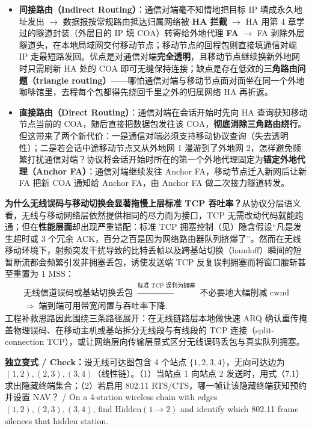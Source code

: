\begin{itemize}
\item \textbf{间接路由（Indirect Routing）}：通信对端毫不知情地把目标 IP 填成永久地址发出 $\to$ 数据报按常规路由抵达归属网络被 \textbf{HA 拦截} $\to$ HA 用第 4 章学过的隧道封装（外层目的 IP 填 COA）转寄给外地代理 \textbf{FA} $\to$ FA 剥除外层隧道头，在本地局域网交付移动节点；移动节点的回程包则直接填通信对端 IP 走最短路发回。优点是对通信对端\textbf{完全透明}，且移动节点继续换新外地网时只需刷新 HA 处的 COA 即可无缝保持连接；缺点是存在低效的\textbf{三角路由问题（triangle routing）}——哪怕通信对端与移动节点面对面坐在同一个外地咖啡馆里，去程每个包都得先绕回千里之外的归属网络 HA 再折返。
\item \textbf{直接路由（Direct Routing）}：通信对端在会话开始时先向 HA 查询获知移动节点当前的 COA，随后直接把数据包发往该 COA，\textbf{彻底消除三角路由绕行}。但这带来了两个新代价：一是通信对端必须支持移动协议查询（失去透明性）；二是若会话中途移动节点又从外地网 1 漫游到了外地网 2，怎样避免频繁打扰通信对端？协议将会话开始时所在的第一个外地代理固定为\textbf{锚定外地代理（Anchor FA）}：通信对端继续发往 Anchor FA，移动节点迁入新网后让新 FA 把新 COA 通知给 Anchor FA，由 Anchor FA 做二次接力隧道转发。
\end{itemize}

\textbf{为什么无线误码与移动切换会显著拖慢上层标准 TCP 吞吐率？}从协议分层语义看，无线与移动网络层依然提供相同的尽力而为接口，TCP 无需改动代码就能跑通；但在\textbf{性能层面}却出现严重错配：标准 TCP 拥塞控制（见）隐含假设“凡是发生超时或 3 个冗余 ACK，百分之百是因为网络路由器队列挤爆了”。然而在无线移动环境下，射频突发干扰导致的比特丢帧以及跨基站切换（handoff）瞬间的短暂断流都会频繁引发非拥塞丢包，诱使发送端 TCP 反复误判拥塞而将窗口腰斩甚至重置为 $1\text{ MSS}$：
\[
\begin{gathered}
\text{无线信道误码或基站切换丢包} \;\xrightarrow{\text{标准 TCP 误判为拥塞}}\; \text{不必要地大幅削减 }\mathrm{cwnd} \\[3pt]
\Longrightarrow\; \text{端到端可用带宽闲置与吞吐率下降}.
\end{gathered}
\tag{7.2}
\]
工程补救思路因此围绕三条路径展开：在无线链路层本地做快速 ARQ 确认重传掩盖物理误码、在移动主机或基站拆分无线段与有线段的 TCP 连接（split-connection TCP），或让网络层向传输层显式区分无线误码丢包与真实队列拥塞。

\textbf{独立变式 / Check：}设无线可达图包含 4 个站点 $\{1, 2, 3, 4\}$，无向可达边为 $(1,2), (2,3), (3,4)$（线性链）。（1）当站点 1 向站点 2 发送时，用式（7.1）求出隐藏终端集合；（2）若启用 802.11 RTS/CTS，哪一帧让该隐藏终端获知预约并设置 NAV？ / On a 4-station wireless chain with edges $(1,2),(2,3),(3,4)$, find $\mathrm{Hidden}(1\to 2)$ and identify which 802.11 frame silences that hidden station.

